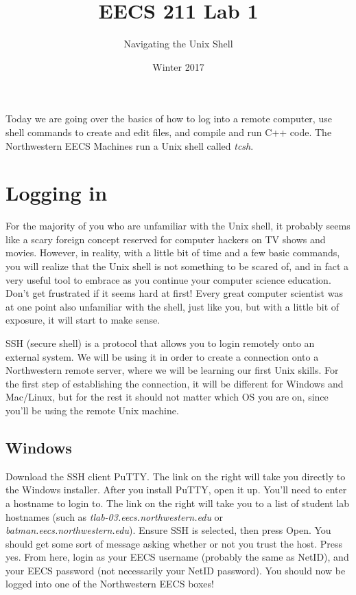 \documentclass{tufte-handout}
\title{EECS 211 Lab 1}
\author{Navigating the Unix Shell}
\date{Winter 2017}
\begin{document}
\maketitle

Today we are going over the basics of how to log into a remote computer,
use shell commands to create and edit files, and compile and run C++
code. The Northwestern EECS Machines run a Unix shell called
\emph{tcsh}.

\section{Logging in}

For the majority of you who are unfamiliar with the Unix shell, it
probably seems like a scary foreign concept reserved for computer
hackers on TV shows and movies.  However, in reality, with a little bit
of time and a few basic commands, you will realize that the Unix shell
is not something to be scared of, and in fact a very useful tool to
embrace as you continue your computer science education. Don't get
frustrated if it seems hard at first! Every great computer scientist was
at one point also unfamiliar with the shell, just like you, but with a
little bit of exposure, it will start to make sense.

SSH (secure shell) is a protocol that allows you to login remotely onto
an external system. We will be using it in order to create a connection
onto a Northwestern remote server, where we will be learning our first
Unix skills. For the first step of establishing the connection, it will
be different for Windows and Mac/Linux, but for the rest it should not
matter which OS you are on, since you'll be using the remote Unix
machine.

\subsection{Windows}

Download the SSH client PuTTY.%
The link on the right will take you
directly to the Windows installer.
After you install PuTTY, open it up. You'll need to enter a hostname to
login to. The link on the right will take you to a list of student lab
hostnames
(such as 
\textit{tlab-03.eecs.northwestern.edu}
or
\textit{batman.eecs.northwestern.edu}). Ensure SSH is selected, then
press Open. You should get some sort of message asking whether or not
you trust the host. Press yes. From here, login as your EECS username
(probably the same as NetID), and your EECS password (not necessarily
your NetID password). You should now be logged into one of the
Northwestern EECS boxes!
\end{document}
